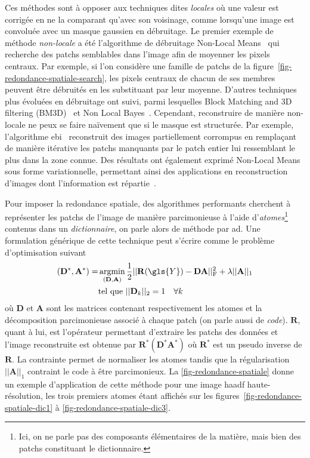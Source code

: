 Ces méthodes sont à opposer aux techniques dites \emph{locales} où une valeur est corrigée en ne la comparant qu'avec son voisinage, comme lorsqu'une image est convoluée avec un masque gaussien en débruitage. Le premier exemple de méthode \emph{non-locale} a été l'algorithme de débruitage Non-Local Means~\cite{buades2005non} qui recherche des patchs semblables dans l'image afin de moyenner les pixels centraux. Par exemple, si l'on considère une famille de patchs de la figure~\ref{fig-redondance-spatiale-search}, les pixels centraux de chacun de ses membres peuvent être débruités en les substituant par leur moyenne. D'autres techniques plus évoluées en débruitage ont suivi, parmi lesquelles Block Matching and 3D filtering (BM3D)~\cite{dabov2007image} et Non Local Bayes~\cite{lebrun2013nonlocal}. Cependant, reconstruire de manière non-locale ne peux se faire naïvement que si le masque est structurée. Par exemple, l'algorithme \gls{ebi}~\cite{criminisi2004region} reconstruit des images partiellement corrompus en remplaçant de manière itérative les patchs manquants par le patch entier lui ressemblant le plus dans la zone connue. Des résultats ont également exprimé Non-Local Means sous forme variationnelle, permettant ainsi des applications en reconstruction d'images dont l'information est répartie~\cite{peyre2008non, unni2018non, arias2009variational, yang2012nonlocal}.

Pour imposer la redondance spatiale, des algorithmes performants cherchent à représenter les patchs de l'image de manière parcimonieuse à l'aide d'\emph{atomes}\footnote{Ici, on ne parle pas des composants élémentaires de la matière, mais bien des patchs constituant le dictionnaire.} contenus dans un \emph{dictionnaire}, on parle alors de méthode par \gls{ad}. Une formulation générique de cette technique peut s'écrire comme le problème d'optimisation suivant~\cite{mairal2009online}
\begin{equation}
    \begin{aligned}
    (\mathbf{D}^*,\mathbf{A}^*) = &\argmin_{(\mathbf{D}, \mathbf{A})}
    \frac{1}{2} \frobnorm{ \mathbf{R}(\gls{Y}) - \mathbf{D A}} + \lambda  || \mathbf{A} ||_1\\
    &\text{tel que } || \mathbf{D}_k ||_2 = 1 \quad \forall k\\
    \end{aligned}
\end{equation}
où $\mathbf{D}$ et $\mathbf{A}$ sont les matrices contenant respectivement les atomes et la décomposition parcimonieuse associé à chaque patch (on parle aussi de \emph{code}). $\mathbf{R}$, quant à lui, est l'opérateur permettant d'extraire les patchs des données et l'image reconstruite est obtenue par $\mathbf{R}^*(\mathbf{D}^*\mathbf{A}^*)$ où $\mathbf{R}^*$ est un pseudo inverse de $\mathbf{R}$. La contrainte permet de normaliser les atomes tandis que la régularisation $|| \mathbf{A} ||_1$ contraint le code à être parcimonieux. 
%
La \cref{fig-redondance-spatiale} donne un exemple d'application de cette méthode pour une image \gls{haadf} haute-résolution, les trois premiers atomes étant affichés sur les figures~\ref{fig-redondance-spatiale-dic1} à \ref{fig-redondance-spatiale-dic3}.
%


